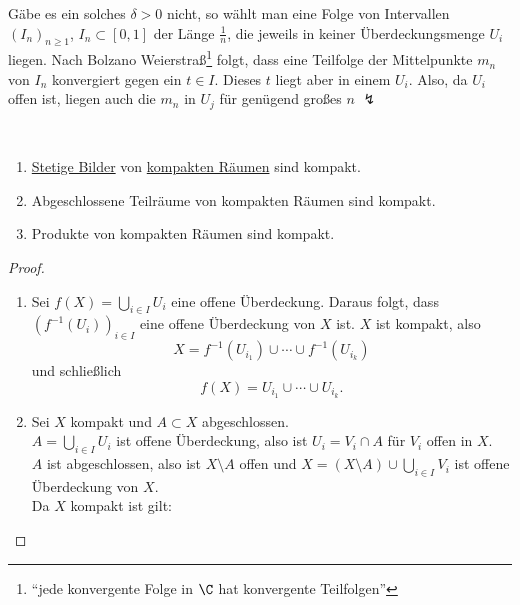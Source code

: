\begin{remark}
  Gäbe es ein solches $ \delta > 0 $ nicht, so wählt man eine Folge von Intervallen $ (I_n)_{n \geq 1} $, $ I_n \subset [0,1] $ der Länge $ \tfrac{1}{n} $, die jeweils in keiner Überdeckungsmenge $ U_i $ liegen. Nach Bolzano Weierstraß\footnote{``jede konvergente Folge in $ \C $ hat konvergente Teilfolgen''} folgt, dass eine Teilfolge der Mittelpunkte $ m_n $ von $ I_n $ konvergiert gegen ein $ t \in I $. Dieses $ t $ liegt aber in einem $ U_i $. Also, da $ U_i $ offen ist, liegen auch die $ m_n $ in $ U_j $ für genügend großes $ n $ $ \lightning $
\end{remark}

\begin{theorem}
  \
  \begin{enumerate}
    \item \hyperref[def:stetig]{Stetige Bilder} von \hyperref[def:kompakt]{kompakten Räumen} sind kompakt.
    \item Abgeschlossene Teilräume von kompakten Räumen sind kompakt.
    \item Produkte von kompakten Räumen sind kompakt. 
  \end{enumerate}
  \begin{proof}
    \
    \begin{enumerate}
      \item Sei $ f(X) = \bigcup_{i \in I} U_i $ eine offene Überdeckung. Daraus folgt, dass $ \left( f^{-1}(U_i) \right)_{i \in I} $ eine offene Überdeckung von $ X $ ist. $ X $ ist kompakt, also
      \begin{equation*}
        X = f^{-1}(U_{i_1}) \cup \cdots \cup f^{-1}(U_{i_k})
      \end{equation*}
      und schließlich
      \begin{equation*}
        f(X) = U_{i_1} \cup \cdots \cup U_{i_k}\text{.}
      \end{equation*}
      \item Sei $ X $ kompakt und $ A \subset X $ abgeschlossen. \\
        $ A = \bigcup_{i \in I} U_i $ ist offene Überdeckung, also ist $ U_i = V_i \cap A $ für $ V_i $ offen in $ X $. \\
        $ A $ ist abgeschlossen, also ist $ X \setminus A $ offen und $ X = (X \setminus A) \cup \bigcup_{i \in I} V_i $ ist offene Überdeckung von $ X $. \\
        Da $ X $ kompakt ist gilt:

\end{enumerate}
\end{proof}
\end{theorem}
